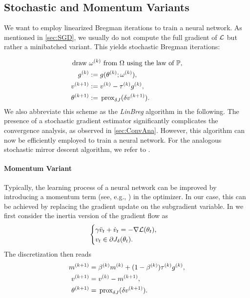 \subsection{Stochastic and Momentum Variants}\label{sec:Bregmom}
%
%
We want to employ linearized Bregman iterations to train a neural network. As mentioned in \cref{sec:SGD}, we usually do not compute the full gradient of $\mathcal{L}$ but rather a minibatched variant. This yields stochastic Bregman iterations:
%

\begin{align}\label{eq:stochlinbreg}
\begin{split}
\text{draw }&\omega^{(k)}\text{ from }\Omega\text{ using the law of }\mathbb{P},\\
g^{(k)} &:= {g(\theta^{(k)};\omega^{(k)})},\\
v^{(k+1)} &:= v^{(k)} - \tau^{(k)} g^{(k)},\\
\theta^{(k+1)} &:= \,\mathrm{prox}_{\delta J}(\delta v^{(k+1)}).
\end{split}
\end{align}
%
We also abbreviate this scheme as the \emph{LinBreg} algorithm in the following.
%
The presence of a stochastic gradient estimator significantly complicates the convergence analysis, as observed in \cref{sec:ConvAna}. However, this algorithm can now be efficiently employed to train a neural network. For the analogous stochastic mirror descent algorithm, we refer to \cite{nemirovski2009robust}.
%
\paragraph{Momentum Variant} Typically, the learning process of a neural network can be improved by introducing a momentum term (see, e.g., \cite{nesterov1983method, qian1999momentum}) in the optimizer. In our case, this can be achieved by replacing the gradient update on the subgradient variable. In \cite{bungert2022bregman} we first consider the inertia version of the gradient flow as
%
\begin{align*}
\begin{cases}
    \gamma \ddot{v}_t + \dot{v}_t = -\nabla\mathcal{L}(\theta_t), \\
    v_t \in \partial J_\delta(\theta_t).
\end{cases}
\end{align*}
%
The discretization then reads
%
\begin{align}\label{eq:momBreg}
\begin{split}
m^{(k+1)} &= \beta^{(k)} m^{(k)} + (1-\beta^{(k)})\tau^{(k)} g^{(k)},\\
v^{(k+1)} &= v^{(k)} - m^{(k+1)},\\
\theta^{(k+1)} &= \,\mathrm{prox}_{\delta J}(\delta v^{(k+1)}).
\end{split}
\end{align}
%
%
